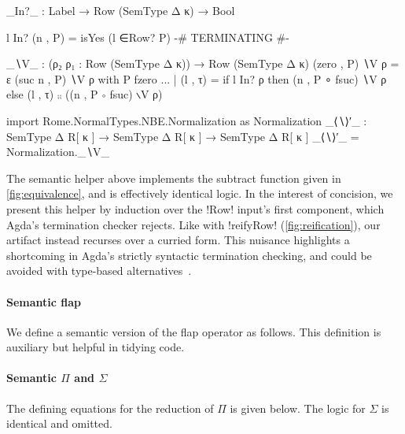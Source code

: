 \begin{AgdaAlign}
\begin{code}
  _In?_ : Label → Row (SemType Δ κ) → Bool
\end{code}
\begin{code}[hide]
  l In? (n , P) = isYes (l ∈Row? P)
  {-# TERMINATING #-}
\end{code}
\begin{code}
  _∖V_ : (ρ₂ ρ₁ : Row (SemType Δ κ)) → Row (SemType Δ κ)
  (zero , P) ∖V ρ = ε 
  (suc n , P) ∖V ρ with P fzero
  ... | (l , τ) = if l In? ρ then 
                  (n , P ∘ fsuc) ∖V ρ else
                  (l , τ) ⨾⨾ ((n , P ∘ fsuc) ∖V ρ)
\end{code}
\begin{code}[hide]
  import Rome.NormalTypes.NBE.Normalization as Normalization
  _⟨∖⟩′_ : SemType Δ R[ κ ] → SemType Δ R[ κ ] → SemType Δ R[ κ ]
  _⟨∖⟩′_ = Normalization._∖V_
\end{code}
\end{AgdaAlign}

The semantic helper above implements the subtract function given in \cref{fig:equivalence}, and is effectively identical logic. In the interest of concision, we present this helper by induction over the !Row! input's first component, which Agda's termination checker rejects. Like with !reifyRow! (\cref{fig:reification}), our artifact instead recurses over a curried form. This nuisance highlights a shortcoming in Agda's strictly syntactic termination checking, and could be avoided with type-based alternatives~\citep{AbelP16, AbreuDHJMS23}.

\paragraph{Semantic flap}
We define a semantic version of the flap operator as follows. This definition is auxiliary but helpful in tidying code.


\paragraph{Semantic $\Pi$ and $\Sigma$} 
\label{sec:semantic-Pi}
The defining equations for the reduction of $\Pi$ is given below. The logic for $\Sigma$ is identical and omitted.

